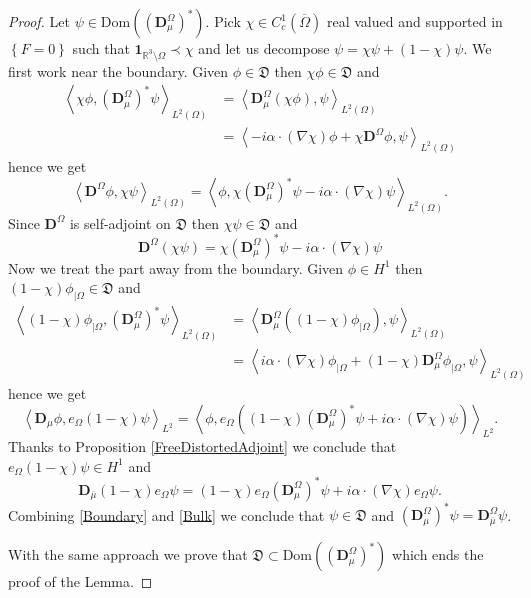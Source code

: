 \documentclass[a4paper, 12pt]{amsart}
\numberwithin{equation}{section}
\newcommand{\R}{\mathbb{R}} %
\newcommand{\lcb}{\left\lbrace} %
\newcommand{\rcb}{\right\rbrace} %
\newcommand{\la}{\left\langle} %
\newcommand{\ra}{\right\rangle} %
\newcommand{\indic}{\mathbf{1}} %
\newcommand{\Dvec}{\mathbf{D}}
\newcommand{\Dfrak}{\mathfrak{D}}
\DeclareMathOperator{\tq}{\mathrm{ | }} %
\newcommand{\Dom}{\mathrm{Dom}} %
\begin{document}
\begin{proof}

    Let $\psi\in\Dom((\Dvec^\Omega_\mu)^*)$. Pick $\chi\in C^1_c(\overline{\Omega})$ real valued and supported in $\lcb F=0\rcb$  such that $\indic_{\R^3\setminus\Omega}\prec\chi$ and let us decompose $\psi=\chi\psi+(1-\chi)\psi$. We first work near the boundary. Given $\phi\in\Dfrak$ then $\chi\phi\in\Dfrak$ and 
    \begin{align*}
        \la\chi\phi,(\Dvec^\Omega_\mu)^*\psi\ra_{L^2(\Omega)}&=\la\Dvec^\Omega_\mu(\chi\phi),\psi\ra_{L^2(\Omega)}\\
        &=\la-i\alpha\cdot(\nabla\chi)\phi+\chi\Dvec^\Omega\phi,\psi\ra_{L^2(\Omega)}
    \end{align*}
    hence we get
    \[\la\Dvec^\Omega\phi,\chi\psi\ra_{L^2(\Omega)}=\la\phi,\chi(\Dvec^\Omega_\mu)^*\psi-i\alpha\cdot(\nabla\chi)\psi\ra_{L^2(\Omega)}.\]
    Since $\Dvec^\Omega$ is self-adjoint on $\Dfrak$ then $\chi\psi\in\Dfrak$ and
    \begin{equation}\label{Boundary}
        \Dvec^\Omega(\chi\psi)=\chi(\Dvec^\Omega_\mu)^*\psi-i\alpha\cdot(\nabla\chi)\psi
    \end{equation}
    Now we treat the part away from the boundary. Given $\phi\in H^1$ then $(1-\chi)\phi_{\tq\Omega}\in\Dfrak$ and
    \begin{align*}
        \la(1-\chi)\phi_{\tq\Omega},(\Dvec^\Omega_\mu)^*\psi\ra_{L^2(\Omega)}&=\la\Dvec^\Omega_\mu((1-\chi)\phi_{\tq\Omega}),\psi\ra_{L^2(\Omega)}\\
        &=\la i\alpha\cdot(\nabla\chi)\phi_{\tq\Omega}+(1-\chi)\Dvec^\Omega_\mu\phi_{\tq\Omega},\psi\ra_{L^2(\Omega)}
    \end{align*}
    hence we get
    \[\la\Dvec_\mu\phi,e_\Omega(1-\chi)\psi\ra_{L^2}=\la\phi,e_\Omega((1-\chi)(\Dvec^\Omega_\mu)^*\psi+i\alpha\cdot(\nabla\chi)\psi)\ra_{L^2}.\]
    Thanks to Proposition \ref{FreeDistortedAdjoint} we conclude that $e_\Omega(1-\chi)\psi\in H^1$ and
    \begin{equation}\label{Bulk}
        \Dvec_{\overline{\mu}}(1-\chi)e_\Omega\psi=(1-\chi)e_\Omega(\Dvec^\Omega_\mu)^*\psi+i\alpha\cdot(\nabla\chi)e_\Omega\psi.
    \end{equation}
    Combining \eqref{Boundary} and \eqref{Bulk} we conclude that $\psi\in\Dfrak$ and $(\Dvec^\Omega_\mu)^*\psi=\Dvec^\Omega_{\overline{\mu}}\psi$.

    
    With the same approach we prove that $\Dfrak\subset\Dom((\Dvec^\Omega_\mu)^*)$ which ends the proof of the Lemma.
\end{proof}
\end{document}
